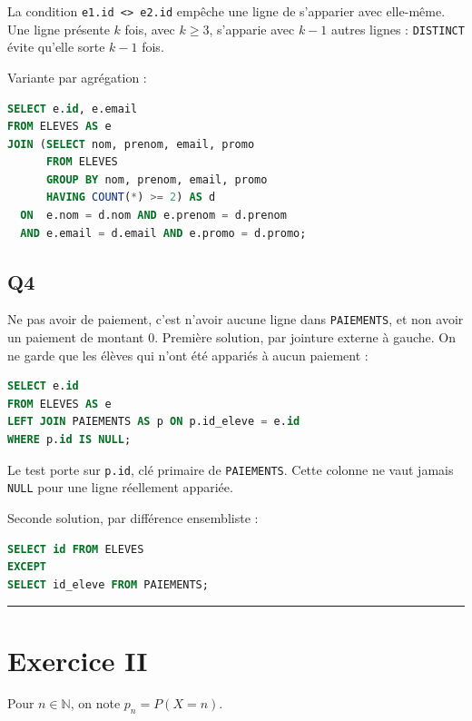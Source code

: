 \documentclass[11pt,a4paper]{article}
\begin{document}
La condition \texttt{e1.id\ \textless{}\textgreater{}\ e2.id} empêche une ligne de s'apparier avec elle-même. Une ligne présente \(k\) fois, avec \(k\ge3\), s'apparie avec \(k-1\) autres lignes : \texttt{DISTINCT} évite qu'elle sorte \(k-1\) fois.

Variante par agrégation :

\begin{lstlisting}[language=SQL]
SELECT e.id, e.email
FROM ELEVES AS e
JOIN (SELECT nom, prenom, email, promo
      FROM ELEVES
      GROUP BY nom, prenom, email, promo
      HAVING COUNT(*) >= 2) AS d
  ON  e.nom = d.nom AND e.prenom = d.prenom
  AND e.email = d.email AND e.promo = d.promo;
\end{lstlisting}

\hypertarget{q4}{%
\subsection{Q4}\label{q4}}

Ne pas avoir de paiement, c'est n'avoir aucune ligne dans \texttt{PAIEMENTS}, et non avoir un paiement de montant 0. Première solution, par jointure externe à gauche. On ne garde que les élèves qui n'ont été appariés à aucun paiement :

\begin{lstlisting}[language=SQL]
SELECT e.id
FROM ELEVES AS e
LEFT JOIN PAIEMENTS AS p ON p.id_eleve = e.id
WHERE p.id IS NULL;
\end{lstlisting}

Le test porte sur \texttt{p.id}, clé primaire de \texttt{PAIEMENTS}. Cette colonne ne vaut jamais \texttt{NULL} pour une ligne réellement appariée.

Seconde solution, par différence ensembliste :

\begin{lstlisting}[language=SQL]
SELECT id FROM ELEVES
EXCEPT
SELECT id_eleve FROM PAIEMENTS;
\end{lstlisting}

\begin{center}\rule{0.5\linewidth}{0.5pt}\end{center}

\hypertarget{exercice-ii}{%
\section{Exercice II}\label{exercice-ii}}

Pour \(n\in\mathbb{N}\), on note \(p_n=P(X=n)\).
\end{document}
